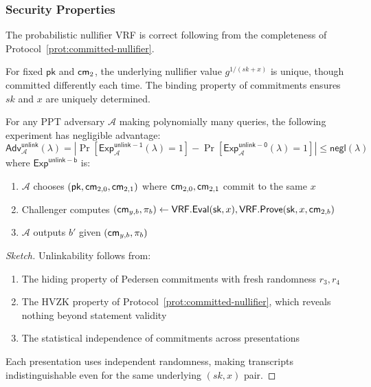 \subsubsection{Security Properties}

\begin{theorem}[Correctness]
The probabilistic nullifier VRF is correct following from the completeness of Protocol~\ref{prot:committed-nullifier}.
\end{theorem}

\begin{theorem}[Uniqueness]
For fixed $\mathsf{pk}$ and $\mathsf{cm}_2$, the underlying nullifier value $g^{1/(sk + x)}$ is unique, though committed differently each time. The binding property of commitments ensures $sk$ and $x$ are uniquely determined.
\end{theorem}

\begin{theorem}[Unlinkability]
For any PPT adversary $\mathcal{A}$ making polynomially many queries, the following experiment has negligible advantage:
\[
\mathsf{Adv}^{\mathsf{unlink}}_{\mathcal{A}}(\lambda) = \left| \Pr[\mathsf{Exp}^{\mathsf{unlink-1}}_{\mathcal{A}}(\lambda) = 1] - \Pr[\mathsf{Exp}^{\mathsf{unlink-0}}_{\mathcal{A}}(\lambda) = 1] \right| \leq \mathsf{negl}(\lambda)
\]
where $\mathsf{Exp}^{\mathsf{unlink-b}}$ is:
\begin{enumerate}
    \item $\mathcal{A}$ chooses $(\mathsf{pk}, \mathsf{cm}_{2,0}, \mathsf{cm}_{2,1})$ where $\mathsf{cm}_{2,0}, \mathsf{cm}_{2,1}$ commit to the same $x$
    \item Challenger computes $(\mathsf{cm}_{y,b}, \pi_b) \leftarrow \mathsf{VRF.Eval}(\mathsf{sk}, x), \mathsf{VRF.Prove}(\mathsf{sk}, x, \mathsf{cm}_{2,b})$
    \item $\mathcal{A}$ outputs $b'$ given $(\mathsf{cm}_{y,b}, \pi_b)$
\end{enumerate}
\end{theorem}

\begin{proof}[Sketch]
Unlinkability follows from:
\begin{enumerate}
    \item The hiding property of Pedersen commitments with fresh randomness $r_3, r_4$
    \item The HVZK property of Protocol~\ref{prot:committed-nullifier}, which reveals nothing beyond statement validity
    \item The statistical independence of commitments across presentations
\end{enumerate}
Each presentation uses independent randomness, making transcripts indistinguishable even for the same underlying $(sk, x)$ pair.
\end{proof}




















